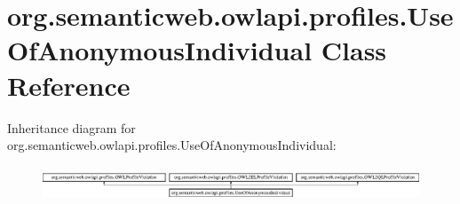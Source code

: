\hypertarget{classorg_1_1semanticweb_1_1owlapi_1_1profiles_1_1_use_of_anonymous_individual}{\section{org.\-semanticweb.\-owlapi.\-profiles.\-Use\-Of\-Anonymous\-Individual Class Reference}
\label{classorg_1_1semanticweb_1_1owlapi_1_1profiles_1_1_use_of_anonymous_individual}
}
Inheritance diagram for org.\-semanticweb.\-owlapi.\-profiles.\-Use\-Of\-Anonymous\-Individual\-:\begin{figure}[H]
\begin{center}
\leavevmode
\includegraphics[height=1.037037cm]{classorg_1_1semanticweb_1_1owlapi_1_1profiles_1_1_use_of_anonymous_individual}
\end{center}
\end{figure}
